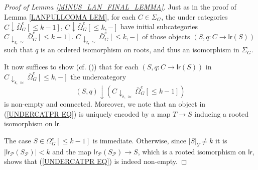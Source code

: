 \documentclass[a4paper,10pt]{article}%
\begin{document}
\begin{proof}[Proof of Lemma \ref{MINUS_LAN_FINAL_LEMMA}]
Just as in the proof of Lemma \ref{LANPULLCOMA LEM}, for each 
$C \in \Sigma_G$, 
the under categories
$C \downarrow \bar{\Omega}_G^e[\leq k-1]$,
$C \downarrow \bar{\Omega}_G^e[\leq k,-]$
have initial subcategories 
$C \downarrow_{\mathsf{r},\simeq} \bar{\Omega}_G^e[\leq k-1]$.
$C \downarrow_{\mathsf{r},\simeq} \bar{\Omega}_G^e[\leq k,-]$
of those objects
$(S,q \colon C \to \mathsf{lr}(S))$ such that 
$q$ is an ordered isomorphism on roots,
and thus an isomorphism in $\Sigma_G$.

It now suffices to show (cf. (\cite[X.3.1]{McL})) that for each
$(S,q \colon C \to \mathsf{lr}(S))$ in 
$C \downarrow_{\mathsf{r},\simeq} \bar{\Omega}_G^e[\leq k,-]$
the undercategory
\begin{equation}\label{UNDERCATPR EQ}
	(S,q) \downarrow  
	(C \downarrow_{\mathsf{r},\simeq} \bar{\Omega}_G^e[\leq k-1])
\end{equation}
is non-empty and connected. 
Moreover, we note that an object in 
(\ref{UNDERCATPR EQ})
is uniquely encoded by a map $T \to S$ inducing a rooted isomorphism on $\mathsf{lr}$.

The case $S\in \Omega_G^e[\leq k-1]$ is immediate. 
Otherwise, since $|S|_Y \neq k$ it is
$|\mathsf{lr}_{\mathcal{P}}(S_{\mathcal{P}})|<k$
and the map 
$\mathsf{lr}_{\mathcal{P}}(S_{\mathcal{P}}) \to S$,
which is a rooted isomorphism on $\mathsf{lr}$, shows that
(\ref{UNDERCATPR EQ}) is indeed non-empty.


\end{proof}
\end{document}
